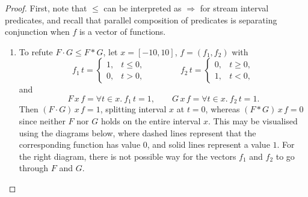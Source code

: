 \documentclass[12pt]{article}
\theoremstyle{definition}
\begin{document}
\begin{proof}
  First, note that $\le$ can be interpreted as $\Rightarrow$ for
  stream interval predicates, and recall that parallel composition of
  predicates is separating conjunction when $f$ is a vector of
  functions. 
\begin{enumerate}
\item To refute $F\cdot G\le F\ast G$, let $x=[-10,10]$, $f=(f_1,f_2)$
  with
  \begin{equation*}
    f_1\, t =
    \begin{cases}
      1, &t\le 0,\\
      0, &t> 0,
    \end{cases}
    \qquad\qquad
    f_2\, t = 
    \begin{cases}
      0, &t\ge 0,\\
      1, &t<0,
          \end{cases}
  \end{equation*}
  and
  \begin{equation*}
    F\, x \, f = \forall t \in x.\ f_1\, t = 1,\qquad G\, x \, f = \forall
  t\in x.\ f_2\, t = 1.
\end{equation*} 
Then $(F\cdot G)\, x\, f =1$, splitting interval $x$ at $t=0$, whereas
$(F \ast G)\, x\, f =0$ since neither $F$ nor $G$ holds on the entire
interval $x$. This may be visualised using the diagrams below, where
dashed lines represent that the corresponding function has value $0$,
and solid lines represent a value $1$. For the right diagram, there is
not possible way for the vectors $f_1$ and $f_2$ to go through $F$ and
$G$. 
\begin{center}
\end{center}
\end{enumerate}
\end{proof}
\end{document}
